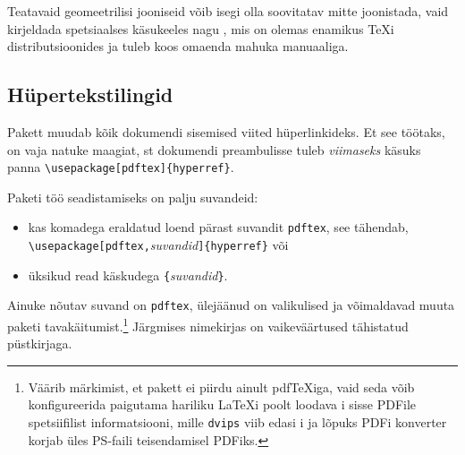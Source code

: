 Teatavaid geomeetrilisi jooniseid võib isegi olla soovitatav mitte
joonistada, vaid kirjeldada spetsiaalses käsukeeles nagu
\MP{}, mis on olemas enamikus \TeX i
distributsioonides ja tuleb koos omaenda mahuka manuaaliga.

\subsection{Hüpertekstilingid}
\label{ssec:pdfhyperref}

Pakett  muudab kõik dokumendi sisemised viited
hüperlinkideks. Et see töötaks, on vaja natuke maagiat,
st dokumendi preambulisse tuleb \emph{viimaseks} käsuks panna
\verb+\usepackage[pdftex]{hyperref}+.

Paketi  töö seadistamiseks on palju suvandeid:
\begin{itemize}
\item kas komadega eraldatud loend pärast suvandit \texttt{pdftex}, see
tähendab, \verb+\usepackage[pdftex,+\emph{suvandid}\verb+]{hyperref}+
või
\item üksikud read käskudega
  \verb+{+\emph{suvandid}\verb+}+.
\end{itemize}

Ainuke nõutav suvand on \texttt{pdftex}, ülejäänud on valikulised ja
võimaldavad muuta paketi  tavakäitumist.\footnote{Väärib
märkimist, et pakett  ei piirdu ainult pdf\TeX iga, vaid
seda võib konfigureerida paigutama hariliku \LaTeX i poolt loodava
i sisse PDFile spetsiifilist informatsiooni, mille
\texttt{dvips} viib edasi i ja lõpuks PDFi konverter korjab
üles PS-faili teisendamisel
PDFiks.} Järgmises
nimekirjas on vaikeväärtused tähistatud püstkirjaga.

